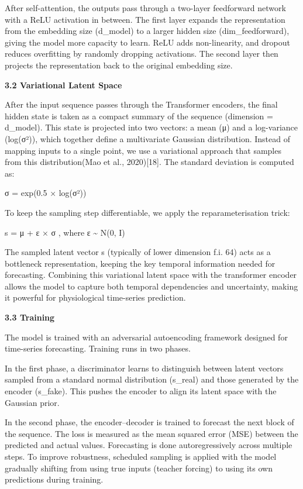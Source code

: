 \documentclass[
]{article}
\begin{document}
After self-attention, the outputs pass through a two-layer feedforward
network with a ReLU activation in between. The first layer expands the
representation from the embedding size (d\_model) to a larger hidden
size (dim\_feedforward), giving the model more capacity to learn. ReLU
adds non-linearity, and dropout reduces overfitting by randomly dropping
activations. The second layer then projects the representation back to
the original embedding size.

\textbf{3.2 Variational Latent Space}

After the input sequence passes through the Transformer encoders, the
final hidden state is taken as a compact summary of the sequence
(dimension = d\_model). This state is projected into two vectors: a mean
(μ) and a log-variance (log(σ²)), which together define a multivariate
Gaussian distribution. Instead of mapping inputs to a single point, we
use a variational approach that samples from this distribution(Mao et
al., 2020){[}18{]}. The standard deviation is computed as:

σ = exp(0.5 × log(σ²))

To keep the sampling step differentiable, we apply the
reparameterisation trick:

s = μ + ε × σ , where ε \textasciitilde{} N(0, I)

The sampled latent vector s (typically of lower dimension f.i. 64) acts
as a bottleneck representation, keeping the key temporal information
needed for forecasting. Combining this variational latent space with the
transformer encoder allows the model to capture both temporal
dependencies and uncertainty, making it powerful for physiological
time-series prediction.

\textbf{3.3 Training}

The model is trained with an adversarial autoencoding framework designed
for time-series forecasting. Training runs in two phases.

In the first phase, a discriminator learns to distinguish between latent
vectors sampled from a standard normal distribution (s\_real) and those
generated by the encoder (s\_fake). This pushes the encoder to align its
latent space with the Gaussian prior.

In the second phase, the encoder--decoder is trained to forecast the
next block of the sequence. The loss is measured as the mean squared
error (MSE) between the predicted and actual values. Forecasting is done
autoregressively across multiple steps. To improve robustness, scheduled
sampling is applied with the model gradually shifting from using true
inputs (teacher forcing) to using its own predictions during training.
\end{document}
